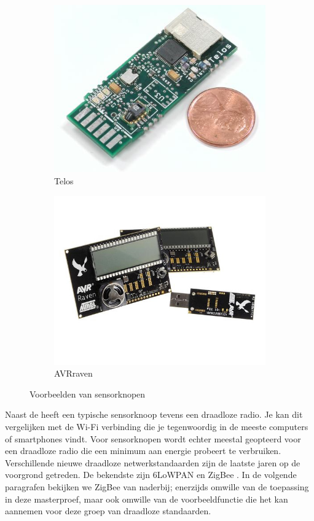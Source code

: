 \begin{figure}[ht]
\begin{subfigure}{.24\textwidth}
  \includegraphics[width=.9\linewidth]{./resources/telos.jpg}
  \caption{Telos}
  \label{fig:telos}
\end{subfigure}
\begin{subfigure}{.24\textwidth}
  \centering
  \includegraphics[width=.9\linewidth]{./resources/raven.jpg}
  \caption{AVRraven}
  \label{fig:raven}
\end{subfigure}
\caption{Voorbeelden van sensorknopen}
\label{fig:motes}
\end{figure}

Naast de \mcu heeft een typische sensorknoop tevens een draadloze radio. Je kan
dit vergelijken met de Wi-Fi verbinding die je tegenwoordig in de meeste
computers of smartphones vindt. Voor sensorknopen wordt echter meestal
geopteerd voor een draadloze radio die een minimum aan energie probeert te
verbruiken. Verschillende nieuwe draadloze netwerkstandaarden zijn de laatste
jaren op de voorgrond getreden. De bekendste zijn 6LoWPAN \citep{rfc:6282} en
ZigBee \citep{alliance2012zigbee}. In de volgende paragrafen bekijken we ZigBee
van naderbij; enerzijds omwille van de toepassing in deze masterproef, maar ook
omwille van de voorbeeldfunctie die het kan aannemen voor deze groep van
draadloze standaarden.

